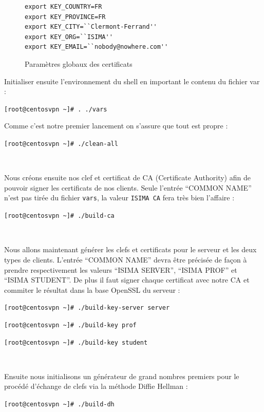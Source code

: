 \begin{figure}[H]
	\begin{center}
		\begin{minipage}{0.90\textwidth}
			\begin{lstlisting}[frame=trBL]
export KEY_COUNTRY=FR
export KEY_PROVINCE=FR
export KEY_CITY=``Clermont-Ferrand''
export KEY_ORG=``ISIMA''
export KEY_EMAIL=``nobody@nowhere.com''
			\end{lstlisting}
		\end{minipage}
	\end{center}
	\caption{Paramètres globaux des certificats}
	\label{easy-rsa-globals}
\end{figure}

Initialiser ensuite l'environnement du shell en important le contenu du fichier var :

\verb|[root@centosvpn ~]# . ./vars|

Comme c'est notre premier lancement on s'assure que tout est propre :

\verb|[root@centosvpn ~]# ./clean-all|

~

Nous créons ensuite nos clef et certificat de CA (Certificate Authority) afin de pouvoir signer les certificats de nos clients. Seule l'entrée ``COMMON NAME'' n'est pas tirée du fichier \verb|vars|, la valeur \verb|ISIMA CA| fera très bien l'affaire :

\verb|[root@centosvpn ~]# ./build-ca|

~

Nous allons maintenant générer les clefs et certificats pour le serveur et les deux types de clients. L'entrée ``COMMON NAME'' devra être précisée de façon à prendre respectivement les valeurs ``ISIMA SERVER'', ``ISIMA PROF'' et ``ISIMA STUDENT''. De plus il faut signer chaque certificat avec notre CA et commiter le résultat dans la base OpenSSL du serveur :

\verb|[root@centosvpn ~]# ./build-key-server server|

\verb|[root@centosvpn ~]# ./build-key prof|

\verb|[root@centosvpn ~]# ./build-key student|

~

Ensuite nous initialisons un générateur de grand nombres premiers pour le procédé d'échange de clefs via la méthode Diffie Hellman :

\verb|[root@centosvpn ~]# ./build-dh|

~

